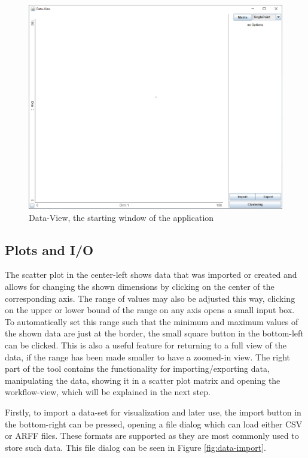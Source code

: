 \documentclass[
	a4paper,
	english,
	twoside,
	openright,               
	11pt                            
	]{report}
\begin{document}
\begin{figure}[h]
	\centering
	\includegraphics[scale=.45]{data-view}
	\caption{Data-View, the starting window of the application}
	\label{fig:data-view}
\end{figure}

\subsection{Plots and I/O}\label{sec:plotio}

The scatter plot in the center-left shows data that was imported or created and allows for changing the shown dimensions by clicking on the center of the corresponding axis. The range of values may also be adjusted this way, clicking on the upper or lower bound of the range on any axis opens a small input box. To automatically set this range such that the minimum and maximum values of the shown data are just at the border, the small square button in the bottom-left can be clicked. This is also a useful feature for returning to a full view of the data, if the range has been made smaller to have a zoomed-in view. The right part of the tool contains the functionality for importing/exporting data, manipulating the data, showing it in a scatter plot matrix and opening the workflow-view, which will be explained in the next step.

Firstly, to import a data-set for visualization and later use, the import button in the bottom-right can be pressed, opening a file dialog which can load either CSV or ARFF files. These formats are supported as they are most commonly used to store such data. This file dialog can be seen in Figure \ref{fig:data-import}. 
\end{document}
